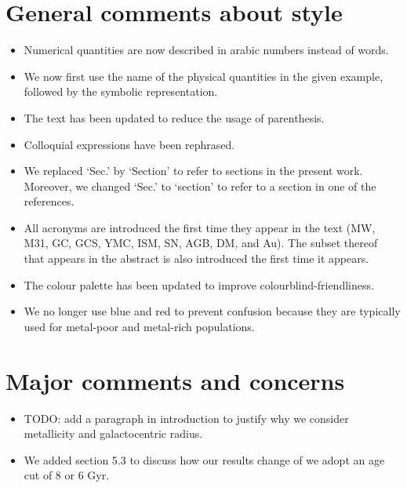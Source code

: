 \documentclass{article}
\begin{document}
\section*{General comments about style}
\begin{itemize}
\item Numerical quantities are now described in arabic numbers instead of words.
\item We now first use the name of the physical quantities in the given example,
    followed by the symbolic representation.
\item The text has been updated to reduce the usage of parenthesis.
\item Colloquial expressions have been rephrased.
\item We replaced `Sec.' by `Section' to refer to sections in the present work.
Moreover, we changed `Sec.' to `section' to refer to a section in one of the references.
\item All acronyms are introduced the first time they appear in the text
(MW, M31, GC, GCS, YMC, ISM, SN, AGB, DM, and Au). The subset thereof that appears 
in the abstract is also introduced the first time it appears.
\item The colour palette has been updated to improve colourblind-friendliness.
\item We no longer use blue and red to prevent confusion because they are 
typically used for metal-poor and metal-rich populations.
\end{itemize}


\section*{Major comments and concerns}
\begin{itemize}
\item TODO: add a paragraph in introduction to justify why we consider metallicity
and galactocentric radius.
\item We added section 5.3 to discuss how our results change of we adopt an age cut
of 8 or 6 Gyr.
\end{itemize}
\end{document}
